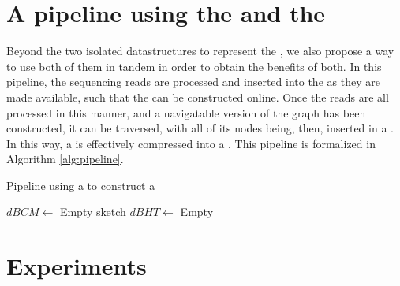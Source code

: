 \section{A pipeline using the \dBCM and the \dBHT}


Beyond the two isolated datastructures to represent the \dBG, we also propose a way to use both of them in tandem in order to obtain
the benefits of both. In this pipeline, the sequencing reads are processed and inserted into the \dBCM as they are made available,
such that the \dBG can be constructed online. Once the reads are all processed in this manner, and a navigatable version of the graph 
has been constructed, it can be traversed, with all of its nodes being, then, inserted in a \dBHT. In this way, a \dBCM is effectively
compressed into a \dBHT. This pipeline is formalized in Algorithm \ref{alg:pipeline}.

\begin{algorithm}
  \caption{Pipeline using a \dBCM to construct a \dBHT}\label{alg:pipeline}
  $\mathit{dBCM} \gets$ Empty \dBCM sketch\;
  $\mathit{dBHT} \gets$ Empty \dBHT\;
\end{algorithm}

\section{Experiments}

